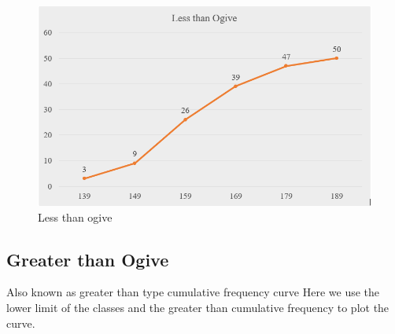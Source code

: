 \documentclass[
]{book}
\begin{document}
\begin{figure}

{\centering \includegraphics[width=0.9\linewidth]{images/lessogive} 

}

\caption{Less than ogive}\label{fig:lessogive}
\end{figure}

\subsection{Greater than Ogive}\label{greater-than-ogive}

Also known as greater than type cumulative frequency curve Here we use
the lower limit of the classes and the greater than cumulative frequency
to plot the curve.
\end{document}
